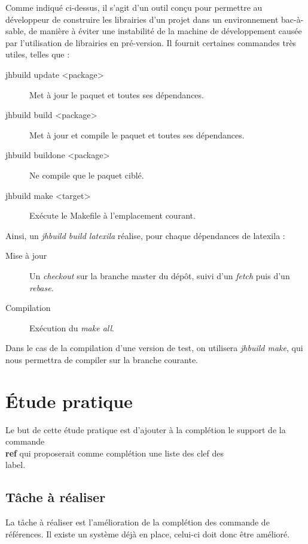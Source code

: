 \documentclass[a4paper,11pt]{report}
\begin{document}
Comme indiqué ci-dessus, il s'agit d'un outil conçu pour permettre au développeur de construire les librairies d'un projet dans un environnement bac-à-sable, de manière à éviter une instabilité de la machine de développement causée par l'utilisation de librairies en pré-version. Il fournit certaines commandes très utiles, telles que :

\begin{description}
  \item[jhbuild update <package>] Met à jour le paquet et toutes ses dépendances.
  \item[jhbuild build <package>] Met à jour et compile le paquet et toutes ses dépendances.
  \item[jhbuild buildone <package>] Ne compile que le paquet ciblé.
  \item[jhbuild make <target>] Exécute le Makefile à l'emplacement courant.
\end{description}

Ainsi, un \textit{jhbuild build latexila} réalise, pour chaque dépendances de latexila :

\begin{description} 
  \item[Mise à jour] Un \textit{checkout} sur la branche master du dépôt, suivi d'un \textit{fetch} puis d'un \textit{rebase}.
  \item[Compilation] Exécution du \textit{make all}.
\end{description}

Dans le cas de la compilation d'une version de test, on utilisera \textit{jhbuild make}, qui nous permettra de compiler sur la branche courante.

\chapter{Étude pratique} %
\label{cha:etude_pratique}
Le but de cette étude pratique est d'ajouter à la complétion le support de la commande \textbf{\\ref} qui proposerait comme complétion une liste des clef des \\label.

\section{Tâche à réaliser} %
\label{sec:tache_a_realiser}
La tâche à réaliser est l'amélioration de la complétion des commande de références. Il existe un système déjà en place, celui-ci doit donc être amélioré.
\end{document}
